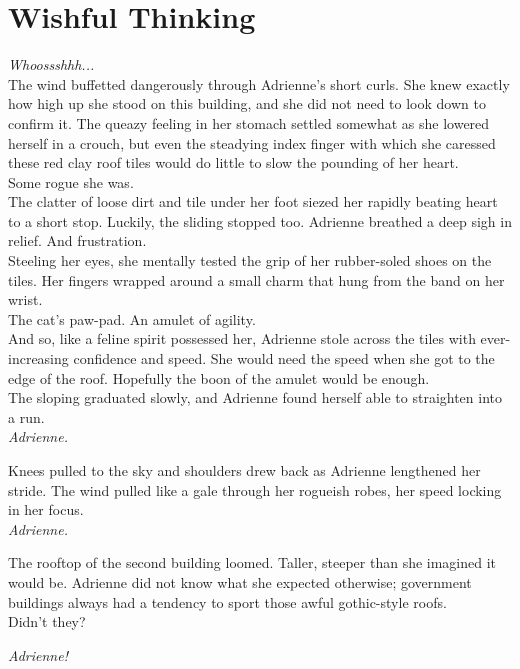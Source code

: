 \chapter{Wishful Thinking}

\textit{Whoossshhh...}\\

The wind buffetted dangerously through Adrienne's short curls. 
She knew exactly how high up she stood on this building, and she did not need to look down to confirm it.
The queazy feeling in her stomach settled somewhat as she lowered herself in a crouch, 
but even the steadying index finger with which she caressed these red clay roof tiles would do little to slow the pounding of her heart.\\

Some rogue she was.\\

The clatter of loose dirt and tile under her foot siezed her rapidly beating heart to a short stop.
Luckily, the sliding stopped too.
Adrienne breathed a deep sigh in relief. 
And frustration.\\

Steeling her eyes, she mentally tested the grip of her rubber-soled shoes on the tiles. 
Her fingers wrapped around a small charm that hung from the band on her wrist.\\

The cat's paw-pad. An amulet of agility.\\

And so, like a feline spirit possessed her, Adrienne stole across the tiles with ever-increasing confidence and speed.
She would need the speed when she got to the edge of the roof.
Hopefully the boon of the amulet would be enough.\\

The sloping graduated slowly, and Adrienne found herself able to straighten into a run.\\

\textit{Adrienne.}

Knees pulled to the sky and shoulders drew back as Adrienne lengthened her stride.
The wind pulled like a gale through her rogueish robes, her speed locking in her focus.\\

\textit{Adrienne.}

The rooftop of the second building loomed. 
Taller, steeper than she imagined it would be.
Adrienne did not know what she expected otherwise; government buildings always had a tendency to sport those awful gothic-style roofs. \\

Didn't they?

\textit{Adrienne!}

